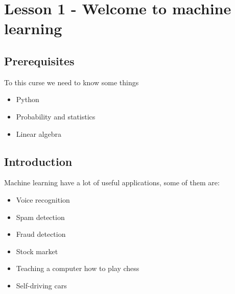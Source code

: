 \chapter{Lesson 1 - Welcome to machine learning}
\section{Prerequisites}
To this curse we need to know some things
\begin{itemize}
    \item {Python}
    \item {Probability and statistics}
    \item {Linear algebra}
\end{itemize}

\section{Introduction}
Machine learning have a lot of useful applications, some of them are:
\begin{itemize}
    \item {Voice recognition}
    \item {Spam detection}
    \item {Fraud detection}
    \item {Stock market}
    \item {Teaching a computer how to play chess}
    \item {Self-driving cars}
\end{itemize}